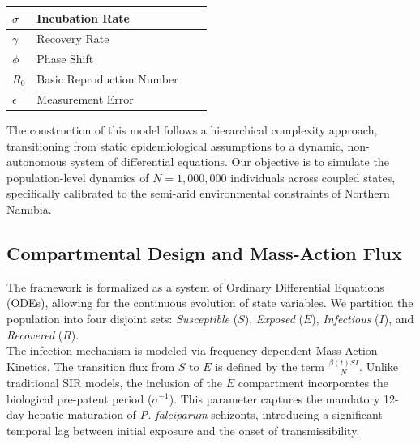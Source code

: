 \documentclass[12pt,a4paper]{report} %
\begin{document}
\begin{table}[H]
\begin{tabular}{|l|p{6cm}|l|p{4cm}|}
$\sigma$ & Incubation Rate \\\hline%
$\gamma$ & Recovery Rate \\\hline%
$\phi$ & Phase Shift \\\hline%
$R_0$ & Basic Reproduction Number \\\hline%
$\epsilon$ & Measurement Error \\\hline%
\end{tabular}
\end{table}
The construction of this model follows a hierarchical complexity approach, transitioning from static epidemiological assumptions to a dynamic, non-autonomous system of differential equations. Our objective is to simulate the population-level dynamics of $N=1,000,000$ individuals across coupled states, specifically calibrated to the semi-arid environmental constraints of Northern Namibia.

\subsection{Compartmental Design and Mass-Action Flux}
The framework is formalized as a system of Ordinary Differential Equations (ODEs), allowing for the continuous evolution of state variables. We partition the population into four disjoint sets: \textit{Susceptible} ($S$), \textit{Exposed} ($E$), \textit{Infectious} ($I$), and \textit{Recovered} ($R$).\\
The infection mechanism is modeled via frequency dependent Mass Action Kinetics. The transition flux from $S$ to $E$ is defined by the term $\frac{\beta(t)SI}{N}$. Unlike traditional SIR models, the inclusion of the $E$ compartment incorporates the biological pre-patent period ($\sigma^{-1}$). This parameter captures the mandatory 12-day hepatic maturation of \textit{P. falciparum} schizonts, introducing a significant temporal lag between initial exposure and the onset of transmissibility.
\end{document}
